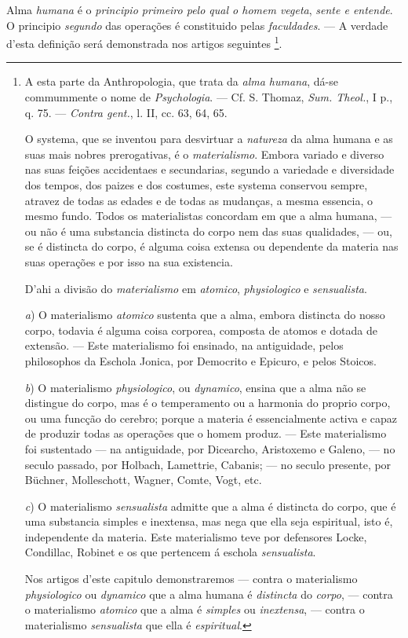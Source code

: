 Alma \emph{humana} é o \emph{principio primeiro pelo qual o homem vegeta}, \emph{sente e entende}. O principio \emph{segundo} das operações é constituido pelas \emph{faculdades}. --- A verdade d'esta definição será demonstrada nos artigos seguintes \footnote{A esta parte da Anthropologia, que trata da \emph{alma humana}, dá-se commummente o nome de \emph{Psychologia}. --- Cf. S. Thomaz, \emph{Sum. Theol.}, I p., q. 75. --- \emph{Contra gent.}, l. II, cc. 63, 64, 65.\par O systema, que se inventou para desvirtuar a \emph{natureza} da alma humana e as suas mais nobres prerogativas, é o \emph{materialismo}. Embora variado e diverso nas suas feições accidentaes e secundarias, segundo a variedade e diversidade dos tempos, dos paizes e dos costumes, este systema conservou sempre, atravez de todas as edades e de todas as mudanças, a mesma essencia, o mesmo fundo. Todos os materialistas concordam em que a alma humana, --- ou não é uma substancia distincta do corpo nem das suas qualidades, --- ou, se é distincta do corpo, é alguma coisa extensa ou dependente da materia nas suas operações e por isso na sua existencia.\par D'ahi a divisão do \emph{materialismo} em \emph{atomico}, \emph{physiologico} e \emph{sensualista}.\par \emph{a}) O materialismo \emph{atomico} sustenta que a alma, embora distincta do nosso corpo, todavia é alguma coisa corporea, composta de atomos e dotada de extensão. --- Este materialismo foi ensinado, na antiguidade, pelos philosophos da Eschola Jonica, por Democrito e Epicuro, e pelos Stoicos.\par \emph{b}) O materialismo \emph{physiologico}, ou \emph{dynamico}, ensina que a alma não se distingue do corpo, mas é o temperamento ou a harmonia do proprio corpo, ou uma funcção do cerebro; porque a materia é essencialmente activa e capaz de produzir todas as operações que o homem produz. --- Este materialismo foi sustentado --- na antiguidade, por Dicearcho, Aristoxemo e Galeno, --- no seculo passado, por Holbach, Lamettrie, Cabanis; --- no seculo presente, por Büchner, Molleschott, Wagner, Comte, Vogt, etc.\par \emph{c}) O materialismo \emph{sensualista} admitte que a alma é distincta do corpo, que é uma substancia simples e inextensa, mas nega que ella seja espiritual, isto é, independente da materia. Este materialismo teve por defensores Locke, Condillac, Robinet e os que pertencem á eschola \emph{sensualista}.\par Nos artigos d'este capitulo demonstraremos --- contra o materialismo \emph{physiologico} ou \emph{dynamico} que a alma humana é \emph{distincta} do \emph{corpo}, --- contra o materialismo \emph{atomico} que a alma é \emph{simples} ou \emph{inextensa}, --- contra o materialismo \emph{sensualista} que ella é \emph{espiritual}.}.

